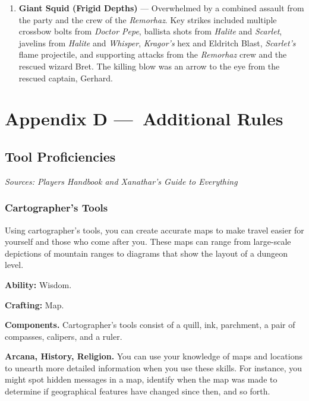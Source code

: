 \documentclass[
  letterpaper,12pt,twoside,twocolumn,openany,
  nodeprecatedcode,bg=full]{dndbook}
\begin{document}
\begin{enumerate}
  a first javelin, two bolts from \emph{Doctor Pepe}, an arrow and
  Dissonant Whispers from \emph{Elara}, \emph{Kragor's} hex and Eldritch
  Blast, and \emph{Scarlet's} shillelagh.
\item
  \textbf{Giant Squid (Frigid Depths)} --- Overwhelmed by a combined
  assault from the party and the crew of the \emph{Remorhaz}. Key
  strikes included multiple crossbow bolts from \emph{Doctor Pepe},
  ballista shots from \emph{Halite} and \emph{Scarlet}, javelins from
  \emph{Halite} and \emph{Whisper}, \emph{Kragor's} hex and Eldritch
  Blast, \emph{Scarlet's} flame projectile, and supporting attacks from
  the \emph{Remorhaz} crew and the rescued wizard Bret. The killing blow
  was an arrow to the eye from the rescued captain, Gerhard.
\end{enumerate}

\chapter{Appendix D ---~Additional
Rules}\label{appendix-d-additional-rules}

\section{Tool Proficiencies}\label{tool-proficiencies}

\emph{Sources: Players Handbook and Xanathar's Guide to Everything}

\subsection{Cartographer's Tools}\label{cartographers-tools}

Using cartographer's tools, you can create accurate maps to make travel
easier for yourself and those who come after you. These maps can range
from large-scale depictions of mountain ranges to diagrams that show the
layout of a dungeon level.

\textbf{Ability:} Wisdom.

\textbf{Crafting:} Map.

\textbf{Components.} Cartographer's tools consist of a quill, ink,
parchment, a pair of compasses, calipers, and a ruler.

\textbf{Arcana, History, Religion.} You can use your knowledge of maps
and locations to unearth more detailed information when you use these
skills. For instance, you might spot hidden messages in a map, identify
when the map was made to determine if geographical features have changed
since then, and so forth.
\end{document}
